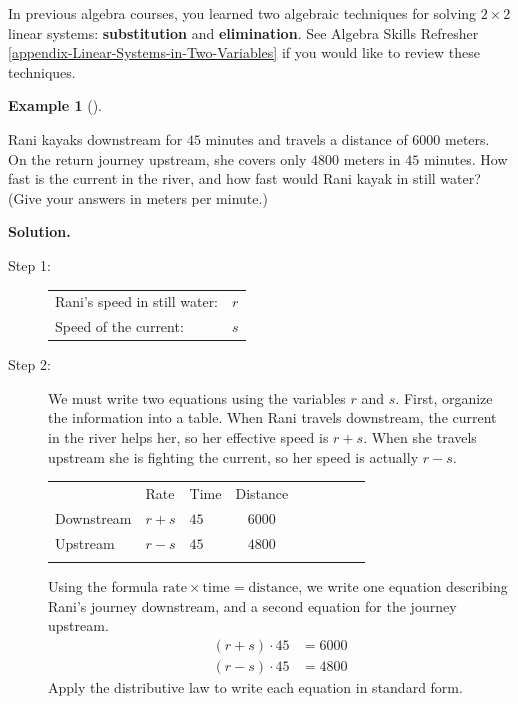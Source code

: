 \documentclass[10pt,]{book}
\newcommand{\terminology}[1]{\textbf{#1}}
\theoremstyle{plain}
\theoremstyle{definition}
\theoremstyle{definition}
\newtheorem{example}[theorem]{Example}
\theoremstyle{definition}
\theoremstyle{definition}
\numberwithin{equation}{section}
\newcommand{\hrulethin}  {\noalign{\hrule height 0.04em}}
\newlength\fight
\newcommand{\amp}{ & }
\begin{document}
	In previous algebra courses, you learned two algebraic techniques for solving \(2\times 2\) linear systems: \terminology{substitution} and \terminology{elimination}. See Algebra Skills Refresher \hyperref[appendix-Linear-Systems-in-Two-Variables]{\ref{appendix-Linear-Systems-in-Two-Variables}} if you would like to review these techniques.
%
\begin{example}[]\label{example-3}

		Rani kayaks downstream for \(45\) minutes and travels a distance of \(6000\) meters. On the return journey upstream, she covers only \(4800\) meters in \(45\) minutes. How fast is the current in the river, and how fast would Rani kayak in still water? (Give your answers in meters per minute.)
\par\medskip\noindent%
\textbf{Solution.}\quad 
		\leavevmode%
\begin{description}
\item[Step 1: ]{}
				\begin{tabular}{ll}
Rani's speed in still water:%
&\(r\)\tabularnewline[0pt]
Speed of the current:%
&\(s\)
\end{tabular}

\item[Step 2:]{}
				We must write two equations using the variables \(r\) and \(s\). First, organize the information into a table. When Rani travels downstream, the current in the river helps her, so her effective speed is \(r+s\). When she travels upstream she is fighting the current, so her speed is actually \(r-s\).
				\begin{tabular}{AlAcAcAcA}\hrulethin
%
&Rate%
&Time%
&Distance%
\tabularnewline\hrulethin
Downstream%
&\(r+s\)&\(45\)&\(6000\)\tabularnewline\hrulethin
Upstream%
&\(r-s\)&\(45\)&\(4800\)\tabularnewline\hrulethin
\end{tabular}

				Using the formula \(\text{rate} \times \text{time} = \text{distance}\), we write one equation describing Rani's journey downstream, and a second equation for the journey upstream.
				\begin{align*}

						(r + s) \cdot 45 \amp = 6000
					\\

						(r − s) \cdot 45 \amp = 4800
					
\end{align*}
				Apply the distributive law to write each equation in standard form.
				\begin{align*}


\end{align*}
\end{description}
\end{example}
\end{document}
